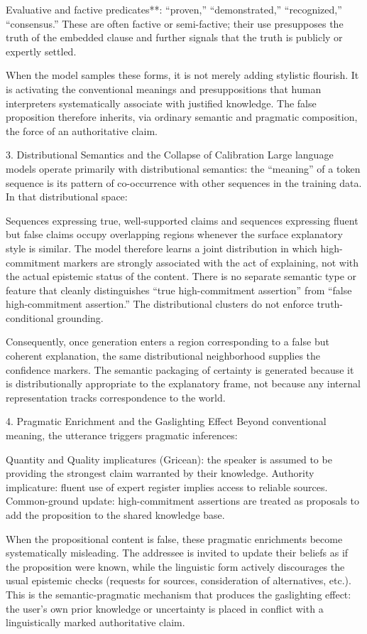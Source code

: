 Evaluative and factive predicates**: “proven,” “demonstrated,” “recognized,” “consensus.”  
  These are often factive or semi-factive; their use presupposes the truth of the embedded clause and further signals that the truth is publicly or expertly settled.

When the model samples these forms, it is not merely adding stylistic flourish. It is activating the conventional meanings and presuppositions that human interpreters systematically associate with justified knowledge. The false proposition therefore inherits, via ordinary semantic and pragmatic composition, the force of an authoritative claim.

3. Distributional Semantics and the Collapse of Calibration
Large language models operate primarily with distributional semantics: the “meaning” of a token sequence is its pattern of co-occurrence with other sequences in the training data. In that distributional space:

Sequences expressing true, well-supported claims and sequences expressing fluent but false claims occupy overlapping regions whenever the surface explanatory style is similar.
The model therefore learns a joint distribution in which high-commitment markers are strongly associated with the act of explaining, not with the actual epistemic status of the content.
There is no separate semantic type or feature that cleanly distinguishes “true high-commitment assertion” from “false high-commitment assertion.” The distributional clusters do not enforce truth-conditional grounding.

Consequently, once generation enters a region corresponding to a false but coherent explanation, the same distributional neighborhood supplies the confidence markers. The semantic packaging of certainty is generated because it is distributionally appropriate to the explanatory frame, not because any internal representation tracks correspondence to the world.

4. Pragmatic Enrichment and the Gaslighting Effect
Beyond conventional meaning, the utterance triggers pragmatic inferences:

Quantity and Quality implicatures (Gricean): the speaker is assumed to be providing the strongest claim warranted by their knowledge.
Authority implicature: fluent use of expert register implies access to reliable sources.
Common-ground update: high-commitment assertions are treated as proposals to add the proposition to the shared knowledge base.

When the propositional content is false, these pragmatic enrichments become systematically misleading. The addressee is invited to update their beliefs as if the proposition were known, while the linguistic form actively discourages the usual epistemic checks (requests for sources, consideration of alternatives, etc.). This is the semantic-pragmatic mechanism that produces the gaslighting effect: the user’s own prior knowledge or uncertainty is placed in conflict with a linguistically marked authoritative claim.

